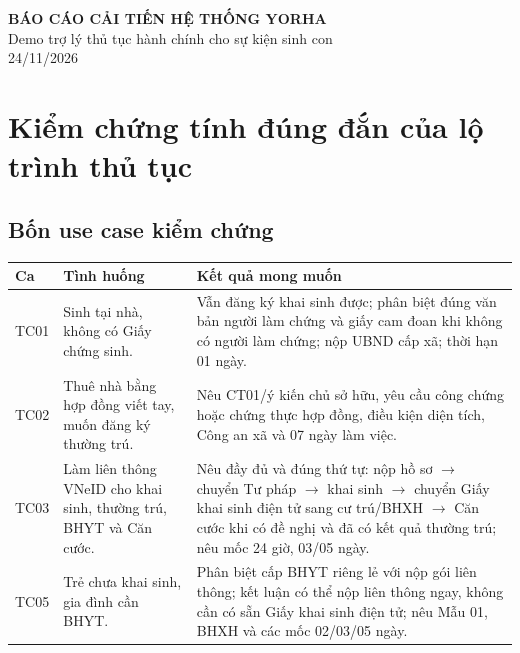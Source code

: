 \documentclass[11pt,a4paper]{article}
\begin{document}
\begin{center}
{\LARGE\bfseries BÁO CÁO CẢI TIẾN HỆ THỐNG YORHA}\\[4pt]
{\large Demo trợ lý thủ tục hành chính cho sự kiện sinh con}\\[4pt]
24/11/2026
\end{center}

\section{Kiểm chứng tính đúng đắn của lộ trình thủ tục}

\subsection{Bốn use case kiểm chứng}

\begin{longtable}{p{1.1cm}p{4.2cm}p{8.1cm}}
\toprule
\textbf{Ca} & \textbf{Tình huống} & \textbf{Kết quả mong muốn}\\
\midrule
\endhead
TC01 & Sinh tại nhà, không có Giấy chứng sinh. & Vẫn đăng ký khai sinh được; phân biệt đúng văn bản người làm chứng và giấy cam đoan khi không có người làm chứng; nộp UBND cấp xã; thời hạn 01 ngày.\\
TC02 & Thuê nhà bằng hợp đồng viết tay, muốn đăng ký thường trú. & Nêu CT01/ý kiến chủ sở hữu, yêu cầu công chứng hoặc chứng thực hợp đồng, điều kiện diện tích, Công an xã và 07 ngày làm việc.\\
TC03 & Làm liên thông VNeID cho khai sinh, thường trú, BHYT và Căn cước. & Nêu đầy đủ và đúng thứ tự: nộp hồ sơ $\rightarrow$ chuyển Tư pháp $\rightarrow$ khai sinh $\rightarrow$ chuyển Giấy khai sinh điện tử sang cư trú/BHXH $\rightarrow$ Căn cước khi có đề nghị và đã có kết quả thường trú; nêu mốc 24 giờ, 03/05 ngày.\\
TC05 & Trẻ chưa khai sinh, gia đình cần BHYT. & Phân biệt cấp BHYT riêng lẻ với nộp gói liên thông; kết luận có thể nộp liên thông ngay, không cần có sẵn Giấy khai sinh điện tử; nêu Mẫu 01, BHXH và các mốc 02/03/05 ngày.\\
\bottomrule
\end{longtable}
\end{document}
